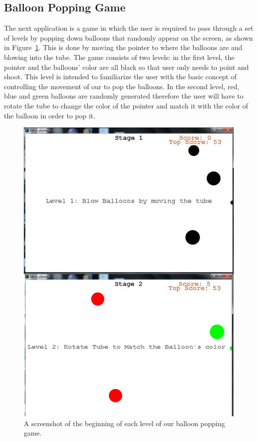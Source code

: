 \subsection{\textbf{Balloon Popping Game}}

The next application is a game in which the user is required to pass through a set of levels by popping down balloons that randomly appear on the screen, as shown in Figure~\ref{fig:shooting-game}. This is done by moving the pointer to where the balloons are and blowing into the tube. The game consists of two levels:  in the first level, the pointer and the balloons' color are all black so that user only needs to point and shoot. This level is intended to familiarize the user with the basic concept of controlling the movement of our \tube to pop the balloons. In the second level, red, blue and green balloons are randomly generated therefore the user will have to rotate the tube to change the color of the pointer and match it with the color of the balloon in order to pop it.

\begin{figure}
  \centering
  \includegraphics[width=0.70\linewidth]{./figs/tubemaster.png}
  \caption{A screenshot of the beginning of each level of our balloon popping game.}
  \label{fig:shooting-game}
\end{figure}


